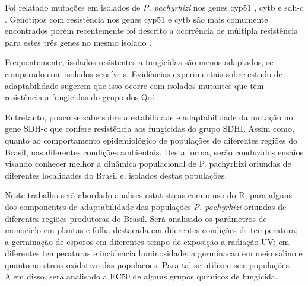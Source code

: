 \documentclass[a4paper,]{book}
\begin{document}
Foi relatado mutações em isolados de \emph{P. pachyrhizi} nos genes
cyp51 \citep{schmitz2013}, cytb \citep{klosowski2015} e sdh-c
\citep{simoes2017}. Genótipos com resistência nos genes cyp51 e cytb são
mais comumente encontrados \citep{klosowski2016} porém recentemente foi
descrito a ocorrência de múltipla resistência para estes três genes no
mesmo isolado \citep{muller}.

Frequentemente, isolados resistentes a fungicidas são menos adaptados,
se comparado com isolados sensíveis. Evidências experimentais sobre
estudo de adaptabilidade sugerem que isso ocorre com isolados mutantes
que têm resistência a fungicidas do grupo dos Qoi \citep{klosowski2016}.

Entretanto, pouco se sabe sobre a estabilidade e adaptabilidade da
mutação no gene SDH-c que confere resistência aos fungicidas do grupo
SDHI. Assim como, quanto ao comportamento epidemiológico de populações
de diferentes regiões do Brasil, nas diferentes condições ambientais.
Desta forma, serão conduzidos ensaios visando conhecer melhor a dinâmica
populacional de P. pachyrhizi oriundas de diferentes localidades do
Brasil e, isolados destas populações.

Neste trabalho será abordado analises estatisticas com o uso do R, para
alguns dos componentes de adaptabilidade das populações \emph{P.
pachyrhizi} oriundas de diferentes regiões produtoras do Brasil. Será
analisado os parâmetros de monociclo em plantas e folha destacada em
diferentes condições de temperatura; a germinação de esporos em
diferentes tempo de exposição a radiação UV; em diferentes temperaturas
e incidencia luminosidade; a germinacao em meio salino e quanto ao
stress oxidativo das populacoes. Para tal se utilizou seis populações.
Alem disso, será analisado a EC50 de alguns grupos quimicos de
fungicida.
\end{document}
